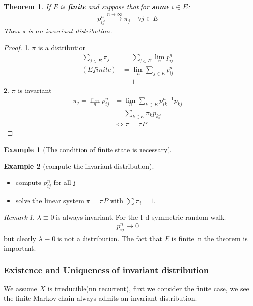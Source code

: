 \documentclass[a4paper,11pt]{book}
\newtheorem{theorem}{Theorem}[section]
\theoremstyle{definition}
\newtheorem*{example}{Example}
\theoremstyle{remark}
\newtheorem*{remark}{Remark}
\begin{document}
\begin{theorem}
If $E$ is \textbf{finite }and suppose that for \textbf{some} $i \in E$:
\begin{align*}
	p_{ij}^n \overset{n \rightarrow \infty}{\rightarrow} \pi_j \quad \forall j \in E
\end{align*}	
Then $\pi$ is an invariant distribution.
\end{theorem}
\begin{proof}
	1. $\pi$ is a distribution
	\begin{align*}
		\sum_{j \in E} \pi_j &= \sum_{j \in E} \lim_n p_{ij}^n \\
		(E finite) &= \lim_n \sum_{j \in E} p_{ij}^n \\
		&= 1
	\end{align*}
	2. $\pi$ is invariant
	\begin{align*}
		\pi_j = \lim_n p_{ij}^n &= \lim_n \sum_{k \in E}p_{ik}^{n -1} p_{kj}\\
		&= \sum_{k \in E} \pi_k p_{kj}\\
		&\Leftrightarrow \pi = \pi P
	\end{align*}
\end{proof}

\begin{example}[The condition of finite state is necessary]
	
\end{example}


\begin{example}[compute the invariant distribution]\quad
\begin{itemize}
	\item compute $p_{ij}^n$ for all j
	\item solve the linear system $\pi = \pi P$ with $\sum \pi_i = 1$.
\end{itemize}
\end{example}
\begin{remark}
$\lambda \equiv 0$ is always invariant. For the 1-d symmetric random walk:
\begin{align*}
	p_{ij}^n \rightarrow 0
\end{align*}	
but clearly $\lambda \equiv 0$ is not a distribution.
The fact that $E$ is finite in the theorem is important.
\end{remark}



\subsubsection{Existence and Uniqueness of invariant distribution}
	We assume $X$ is irreducible(nn recurrent), first we consider the finite case, we see the finite Markov chain always admits an invariant distribution.
\end{document}
